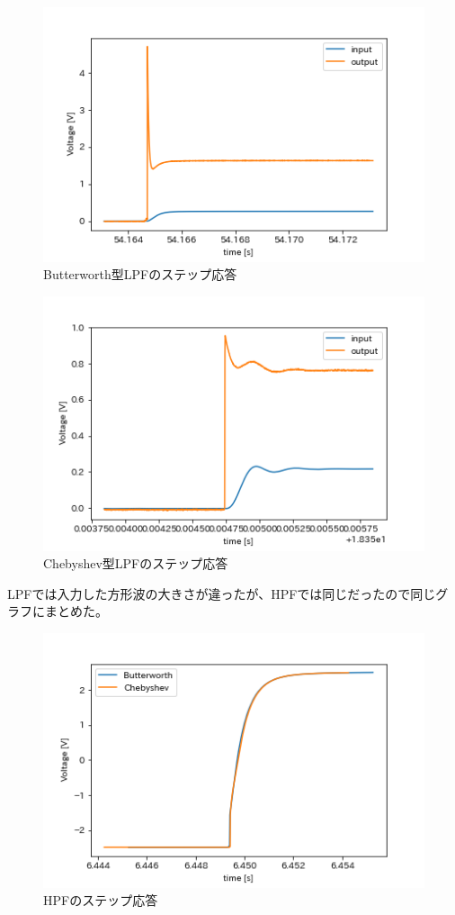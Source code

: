 \documentclass[dvipdfmx, twocolumn]{jsarticle}
\begin{document}
\begin{enumerate}
\begin{itemize}
\begin{figure}[H]
\begin{center}
\includegraphics[scale = 0.5]{stepBL.png}
\caption{Butterworth型LPFのステップ応答}
\end{center}
\end{figure}


\begin{figure}[H]
\begin{center}
\includegraphics[scale = 0.5]{stepCL.png}
\caption{Chebyshev型LPFのステップ応答}
\end{center}
\end{figure}

LPFでは入力した方形波の大きさが違ったが、HPFでは同じだったので同じグラフにまとめた。
\begin{figure}[H]
\begin{center}
\includegraphics[scale = 0.5]{stepHPF.png}
\caption{HPFのステップ応答}
\end{center}
\end{figure}



\end{itemize}
\end{enumerate}
\end{document}
